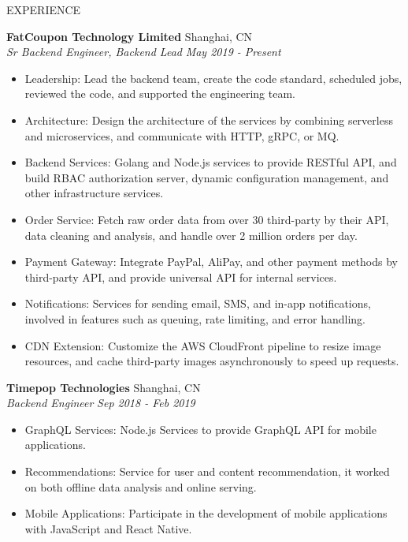 \documentclass{resume} %
\begin{document}
\begin{rSection}{EXPERIENCE}

  \textbf{FatCoupon Technology Limited} \hfill Shanghai, CN\\
  \textit{Sr Backend Engineer, Backend Lead} \hfill \textit{May 2019 - Present}
  \begin{itemize}
    \itemsep -5pt {}
    \item Leadership: Lead the backend team, create the code standard, scheduled jobs, reviewed the code, and supported the engineering team.
    \item Architecture: Design the architecture of the services by combining serverless and microservices, and communicate with HTTP, gRPC, or MQ.
    \item Backend Services: Golang and Node.js services to provide RESTful API, and build RBAC authorization server, dynamic configuration management, and other infrastructure services.
    \item Order Service: Fetch raw order data from over 30 third-party by their API, data cleaning and analysis, and handle over 2 million orders per day.
    \item Payment Gateway: Integrate PayPal, AliPay, and other payment methods by third-party API, and provide universal API for internal services.
    \item Notifications: Services for sending email, SMS, and in-app notifications, involved in features such as queuing, rate limiting, and error handling.
    \item CDN Extension: Customize the AWS CloudFront pipeline to resize image resources, and cache third-party images asynchronously to speed up requests.
  \end{itemize}

  \textbf{Timepop Technologies} \hfill Shanghai, CN\\
  \textit{Backend Engineer} \hfill \textit{Sep 2018 - Feb 2019}
  \begin{itemize}
    \itemsep -5pt {}
    \item GraphQL Services: Node.js Services to provide GraphQL API for mobile applications.
    \item Recommendations: Service for user and content recommendation, it worked on both offline data analysis and online serving.
    \item Mobile Applications: Participate in the development of mobile applications with JavaScript and React Native.
  \end{itemize}


\end{rSection}
\end{document}

